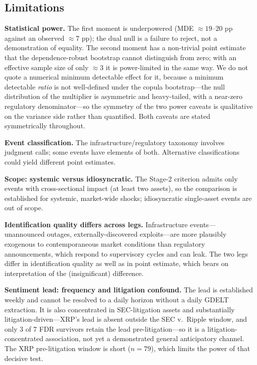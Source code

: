 \documentclass[pdflatex,sn-mathphys-num]{sn-jnl}
\theoremstyle{thmstyleone}
\theoremstyle{thmstyletwo}
\theoremstyle{thmstylethree}
\begin{document}
\subsection{Limitations}\label{sec:limitations}

\textbf{Statistical power.} The first moment is underpowered (MDE $\approx 19$--$20$ pp against an observed $\approx 7$ pp); the dual null is a failure to reject, not a demonstration of equality. The second moment has a non-trivial point estimate that the dependence-robust bootstrap cannot distinguish from zero; with an effective sample size of only $\approx 3$ it is power-limited in the same way. We do not quote a numerical minimum detectable effect for it, because a minimum detectable \emph{ratio} is not well-defined under the copula bootstrap---the null distribution of the multiplier is asymmetric and heavy-tailed, with a near-zero regulatory denominator---so the symmetry of the two power caveats is qualitative on the variance side rather than quantified. Both caveats are stated symmetrically throughout.

\textbf{Event classification.} The infrastructure/regulatory taxonomy involves judgment calls; some events have elements of both. Alternative classifications could yield different point estimates.

\textbf{Scope: systemic versus idiosyncratic.} The Stage-2 criterion admits only events with cross-sectional impact (at least two assets), so the comparison is established for systemic, market-wide shocks; idiosyncratic single-asset events are out of scope.

\textbf{Identification quality differs across legs.} Infrastructure events---unannounced outages, externally-discovered exploits---are more plausibly exogenous to contemporaneous market conditions than regulatory announcements, which respond to supervisory cycles and can leak. The two legs differ in identification quality as well as in point estimate, which bears on interpretation of the (insignificant) difference.

\textbf{Sentiment lead: frequency and litigation confound.} The lead is established weekly and cannot be resolved to a daily horizon without a daily GDELT extraction. It is also concentrated in SEC-litigation assets and substantially litigation-driven---XRP's lead is absent outside the SEC v.\ Ripple window, and only 3 of 7 FDR survivors retain the lead pre-litigation---so it is a litigation-concentrated association, not yet a demonstrated general anticipatory channel. The XRP pre-litigation window is short ($n=79$), which limits the power of that decisive test.
\end{document}
